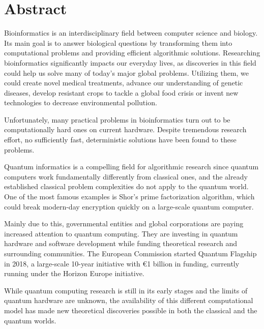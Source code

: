 \vfill
\selectenglish


\chapter*{Abstract}

Bioinformatics is an interdisciplinary field between computer science and biology. Its main goal is to answer biological questions by transforming them into computational problems and providing efficient algorithmic solutions. Researching bioinformatics significantly impacts our everyday lives, as discoveries in this field could help us solve many of today's major global problems. Utilizing them, we could create novel medical treatments, advance our understanding of genetic diseases, develop resistant crops to tackle a global food crisis or invent new technologies to decrease environmental pollution.

Unfortunately, many practical problems in bioinformatics turn out to be computationally hard ones on current hardware. Despite tremendous research effort, no sufficiently fast, deterministic solutions have been found to these problems.

Quantum informatics is a compelling field for algorithmic research since quantum computers work fundamentally differently from classical ones, and the already established classical problem complexities do not apply to the quantum world. One of the most famous examples is Shor's prime factorization algorithm, which could break modern-day encryption quickly on a large-scale quantum computer.

Mainly due to this, governmental entities and global corporations are paying increased attention to quantum computing. They are investing in quantum hardware and software development while funding theoretical research and surrounding communities. The European Commission started Quantum Flagship in 2018, a large-scale 10-year initiative with €1 billion in funding, currently running under the Horizon Europe initiative.

While quantum computing research is still in its early stages and the limits of quantum hardware are unknown, the availability of this different computational model has made new theoretical discoveries possible in both the classical and the quantum worlds.

